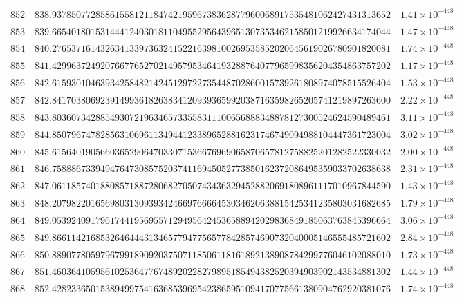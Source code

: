 \documentclass[12pt,reqno]{amsart}
\theoremstyle{remark}
\begin{document}
\begin{longtable}{clc}
$852$ & $838.9378507728586155812118474219596738362877960068917535481062427431313652$ & $1.41\times 10^{-448}$ \\
$853$ & $839.6654018015314441240301811049552956439651307353462158501219926634174044$ & $1.47\times 10^{-448}$ \\
$854$ & $840.2765371614326341339736324152216398100269535852020645619026780901820081$ & $1.74\times 10^{-448}$ \\
$855$ & $841.4299637249207667765270214957953464193288764077965998356204354863757202$ & $1.17\times 10^{-448}$ \\
$856$ & $842.6159301046393425848214245129722735448702860015739261808974078515526404$ & $1.53\times 10^{-448}$ \\
$857$ & $842.8417038069239149936182638341209393659920387163598265205741219897263600$ & $2.22\times 10^{-448}$ \\
$858$ & $843.8036073428854930721963465733558311100656888348878127300524624590489461$ & $3.11\times 10^{-448}$ \\
$859$ & $844.8507967478285631069611349441233896528816231746749094988104447361723004$ & $3.02\times 10^{-448}$ \\
$860$ & $845.6156401905660365290647033071536676969065870657812758825201282522330032$ & $2.00\times 10^{-448}$ \\
$861$ & $846.7588867339494764730857520374116945052773850162372086495359033702638638$ & $2.31\times 10^{-448}$ \\
$862$ & $847.0611857401880857188728068270507434363294528820691808961117010967844590$ & $1.43\times 10^{-448}$ \\
$863$ & $848.2079822016569803130939342466976666453034620638815425341235803031682685$ & $1.79\times 10^{-448}$ \\
$864$ & $849.0539240917961744195695571294956424536588942029836849185063763845396664$ & $3.06\times 10^{-448}$ \\
$865$ & $849.8661142168532646444313465779477565778428574690732040005146555485721602$ & $2.84\times 10^{-448}$ \\
$866$ & $850.8890778059796799189092037507118506118161892138908784299776046102088010$ & $1.73\times 10^{-448}$ \\
$867$ & $851.4603641059561025364776748920228279895185494382520394903902143534881302$ & $1.44\times 10^{-448}$ \\
$868$ & $852.4282336501538949975416368539695423865951094170775661380904762920381076$ & $1.74\times 10^{-448}$ \\

\end{longtable}
\end{document}
